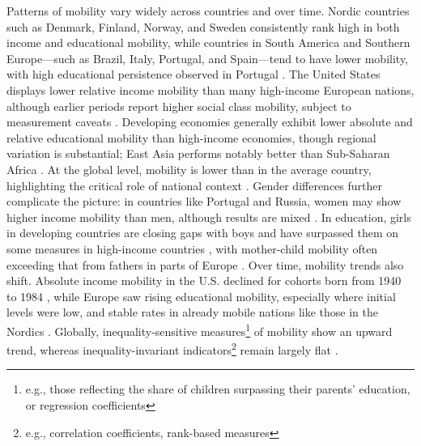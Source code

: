 Patterns of mobility vary widely across countries and over time. Nordic countries such as Denmark, Finland, Norway, and Sweden consistently rank high in both income and educational mobility, while countries in South America and Southern Europe---such as Brazil, Italy, Portugal, and Spain---tend to have lower mobility, with high educational persistence observed in Portugal \citep{blanden2013cross, di2013new, apouey2023ordinal}. The United States displays lower relative income mobility than many high-income European nations, although earlier periods report higher social class mobility, subject to measurement caveats \citep{deutscher2023measuring, blanden2013cross}. Developing economies generally exhibit lower absolute and relative educational mobility than high-income economies, though regional variation is substantial; East Asia performs notably better than Sub-Saharan Africa \citep{narayan2018fair}. At the global level, mobility is lower than in the average country, highlighting the critical role of national context \citep{van2024intergenerational}. Gender differences further complicate the picture: in countries like Portugal and Russia, women may show higher income mobility than men, although results are mixed \citep{clemente2025using, borisov2020intergenerational}. In education, girls in developing countries are closing gaps  with boys \citep{narayan2018fair} and have surpassed them on some measures in high-income countries \citep{van2024intergenerational}, with mother-child mobility often exceeding that from fathers in parts of Europe \citep{apouey2023ordinal}. Over time, mobility trends also shift. Absolute income mobility in the U.S. declined for cohorts born from 1940 to 1984 \citep{narayan2018fair}, while Europe saw rising educational mobility, especially where initial levels were low, and stable rates in already mobile nations like those in the Nordics \citep{di2013new}. Globally, inequality-sensitive measures\footnote{e.g., those reflecting the share of children surpassing their parents' education, or regression coefficients} of mobility show an upward trend, whereas inequality-invariant indicators\footnote{e.g., correlation coefficients, rank-based measures} remain largely flat \citep{van2024intergenerational}.

